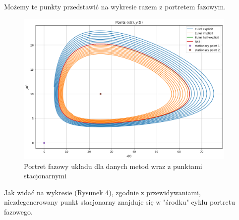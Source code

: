 \documentclass{article}
\begin{document}
Możemy te punkty przedstawić na wykresie razem z portretem fazowym.
\begin{figure}[H]
    \centering
    \includegraphics[width=0.95\textwidth]{3}
    \caption{Portret fazowy układu dla danych metod wraz z punktami stacjonarnymi}
    \label{fig:mesh}
\end{figure}
Jak widać na wykresie (Rysunek 4), zgodnie z przewidywaniami, niezdegenerowany punkt stacjonarny znajduje się w "środku" cyklu portretu fazowego.
\end{document}

